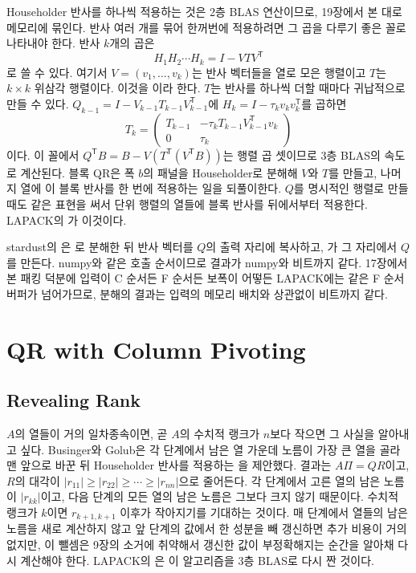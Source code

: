 Householder 반사를 하나씩 적용하는 것은 2층 BLAS 연산이므로, 19장에서 본 대로 메모리에 묶인다. 반사 여러 개를 묶어 한꺼번에 적용하려면 그 곱을 다루기 좋은 꼴로 나타내야 한다. 반사 $k$개의 곱은
\[
H_1H_2\cdots H_k=I-VTV^{\mathsf T}
\]
로 쓸 수 있다. 여기서 $V=(v_1,\dots,v_k)$는 반사 벡터들을 열로 모은 행렬이고 $T$는 $k\times k$ 위삼각 행렬이다\cite{bischof1987wy,schreiber1989wy}. 이것을 이라 한다. $T$는 반사를 하나씩 더할 때마다 귀납적으로 만들 수 있다. $Q_{k-1}=I-V_{k-1}T_{k-1}V_{k-1}^{\mathsf T}$에 $H_k=I-\tau_kv_kv_k^{\mathsf T}$를 곱하면
\[
T_k=\begin{pmatrix}T_{k-1}&-\tau_kT_{k-1}V_{k-1}^{\mathsf T}v_k\\0&\tau_k\end{pmatrix}
\]
이다. 이 꼴에서 $Q^{\mathsf T}B=B-V(T^{\mathsf T}(V^{\mathsf T}B))$는 행렬 곱 셋이므로 3층 BLAS의 속도로 계산된다. 블록 QR은 폭 $b$의 패널을 Householder로 분해해 $V$와 $T$를 만들고, 나머지 열에 이 블록 반사를 한 번에 적용하는 일을 되풀이한다. $Q$를 명시적인 행렬로 만들 때도 같은 표현을 써서 단위 행렬의 열들에 블록 반사를 뒤에서부터 적용한다. LAPACK의 가 이것이다.

\begin{instardust}
stardust의 은 로 분해한 뒤 반사 벡터를 $Q$의 출력 자리에 복사하고, 가 그 자리에서 $Q$를 만든다. numpy와 같은 호출 순서이므로 결과가 numpy와 비트까지 같다. 17장에서 본 패킹 덕분에 입력이 C 순서든 F 순서든 보폭이 어떻든 LAPACK에는 같은 F 순서 버퍼가 넘어가므로, 분해의 결과는 입력의 메모리 배치와 상관없이 비트까지 같다.
\end{instardust}

\section{QR with Column Pivoting}
\label{sec:pivoted-qr}

\subsection{Revealing Rank}

$A$의 열들이 거의 일차종속이면, 곧 $A$의 수치적 랭크가 $n$보다 작으면 그 사실을 알아내고 싶다. Businger와 Golub은 각 단계에서 남은 열 가운데 노름이 가장 큰 열을 골라 맨 앞으로 바꾼 뒤 Householder 반사를 적용하는 을 제안했다\cite{businger1965}. 결과는 $A\Pi=QR$이고, $R$의 대각이 $|r_{11}|\ge|r_{22}|\ge\cdots\ge|r_{nn}|$으로 줄어든다. 각 단계에서 고른 열의 남은 노름이 $|r_{kk}|$이고, 다음 단계의 모든 열의 남은 노름은 그보다 크지 않기 때문이다. 수치적 랭크가 $k$이면 $r_{k+1,k+1}$ 이후가 작아지기를 기대하는 것이다. 매 단계에서 열들의 남은 노름을 새로 계산하지 않고 앞 단계의 값에서 한 성분을 빼 갱신하면 추가 비용이 거의 없지만, 이 뺄셈은 9장의 소거에 취약해서 갱신한 값이 부정확해지는 순간을 알아채 다시 계산해야 한다\cite{drmac2008}. LAPACK의 은 이 알고리즘을 3층 BLAS로 다시 짠 것이다\cite{quintana1998geqp3}.

